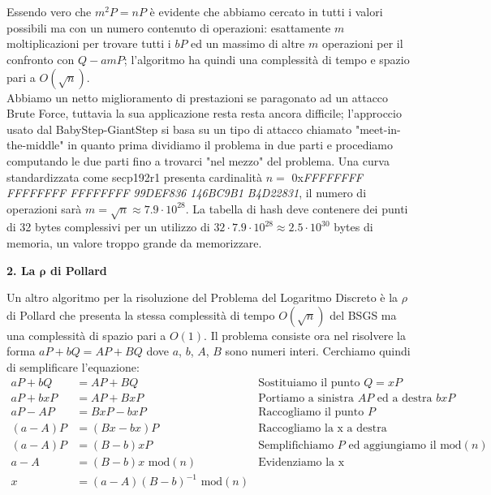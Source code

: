 \documentclass[a4paper,12pt]{tesiinfo}
\begin{document}
\\
\\
Essendo vero che $m^2P=nP$ \`e evidente che abbiamo cercato in tutti i valori possibili ma con un numero contenuto di operazioni: esattamente $m$ moltiplicazioni per trovare tutti i $bP$ ed un massimo di altre $m$ operazioni per il confronto con $Q-amP$; l'algoritmo ha quindi una complessit\`a di tempo e spazio pari a $O(\sqrt{n})$.
\\
Abbiamo un netto miglioramento di prestazioni se paragonato ad un attacco Brute Force, tuttavia la sua applicazione resta resta ancora difficile; l'approccio usato dal BabyStep-GiantStep si basa su un tipo di attacco chiamato "meet-in-the-middle" in quanto prima dividiamo il problema in due parti e procediamo computando le due parti fino a trovarci "nel mezzo" del problema. Una curva standardizzata come secp192r1 presenta cardinalit\`a $n = $ 0x\textit{FFFFFFFF FFFFFFFF FFFFFFFF 99DEF836 146BC9B1 B4D22831}, il numero di operazioni sar\`a $m = \sqrt{n} \approx 7.9 \cdot 10^{28}$. La tabella di hash deve contenere dei punti di 32 bytes complessivi per un utilizzo di $32 \cdot 7.9\cdot 10^{28} \approx 2.5 \cdot 10^{30}$ bytes di memoria, un valore troppo grande da memorizzare.
\\
\begin{center}
    \textbf{2. La $\mathbold{\rho}$ di Pollard}
\end{center}
Un altro algoritmo per la risoluzione del Problema del Logaritmo Discreto \`e la $\rho$ di Pollard che presenta la stessa complessit\`a di tempo $O(\sqrt{n})$ del BSGS ma una complessit\`a di spazio pari a $O(1)$. Il problema consiste ora nel risolvere la forma $aP + bQ = AP + BQ$ dove $a$, $b$, $A$, $B$ sono numeri interi. Cerchiamo quindi di semplificare l'equazione:
\begin{align*}
    aP + bQ &= AP + BQ &\text{Sostituiamo il punto }Q = xP\\
    aP + bxP &= AP + BxP &\text{Portiamo a sinistra $AP$ ed a destra $bxP$}\\
    aP -AP &= BxP -bxP &\text{Raccogliamo il punto }P\\
    (a -A)P &= (Bx -bx)P &\text{Raccogliamo la x a destra}\\
    (a -A)P &= (B -b)xP &\text{Semplifichiamo $P$ ed aggiungiamo il mod$(n)$}\\
    a -A &= (B -b)x\text{ mod$(n)$} &\text{Evidenziamo la x}\\
    x &= (a -A)(B -b)^{-1}\text{ mod$(n)$}
\end{align*}
\end{document}
